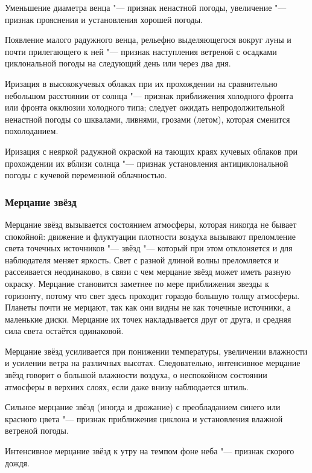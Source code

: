  Уменьшение диаметра венца "--- признак ненастной погоды,
увеличение "--- признак прояснения и установления хорошей погоды.

 Появление малого радужного венца, рельефно выделяющегося вокруг
луны и почти прилегающего к ней "--- признак наступления ветреной с
осадками циклональной погоды на следующий день или через два дня.

 Иризация в высококучевых облаках при их прохождении на
сравнительно небольшом расстоянии от солнца "--- признак приближения
холодного фронта или фронта окклюзии холодного типа; следует ожидать
непродолжительной ненастной погоды со шквалами, ливнями, грозами
(летом), которая сменится похолоданием.

 Иризация с неяркой радужной окраской на тающих краях кучевых
облаков при прохождении их вблизи солнца "--- признак установления
антициклональной погоды с кучевой переменной облачностью.

\subsubsection{Мерцание звёзд}

Мерцание звёзд вызывается состоянием атмосферы, которая никогда не
бывает спокойной: движение и флуктуации плотности воздуха вызывают
преломление света точечных источников "--- звёзд "--- который при этом
отклоняется и для наблюдателя меняет яркость. Свет с разной длиной
волны преломляется и рассеивается неодинаково, в связи с чем мерцание
звёзд может иметь разную окраску. Мерцание становится заметнее по мере
приближения звезды к горизонту, потому что свет здесь проходит гораздо
большую толщу атмосферы. Планеты почти не мерцают, так как они видны
не как точечные источники, а маленькие диски. Мерцание их точек
накладывается друг от друга, и средняя сила света остаётся одинаковой.

Мерцание звёзд усиливается при понижении температуры, увеличении
влажности и усилении ветра на различных высотах. Следовательно,
интенсивное мерцание звёзд говорит о большой влажности воздуха, о
неспокойном состоянии атмосферы в верхних слоях, если даже внизу
наблюдается штиль.

 Сильное мерцание звёзд (иногда и дрожание) с преобладанием
синего или красного цвета "--- признак приближения циклона и установления
влажной ветреной погоды.

 Интенсивное мерцание звёзд к утру на темпом фоне неба "---
признак скорого дождя.

